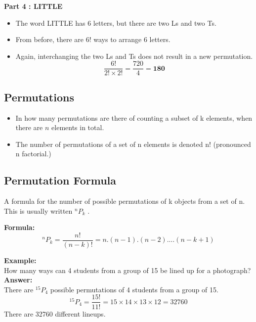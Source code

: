 \documentclass[12pt]{report}
\begin{document}
		\textbf{Part 4 : LITTLE}\\
		\begin{itemize}
			\item The word LITTLE has 6 letters, but there are two Ls and two Ts.
			\item From before, there are 6! ways to arrange 6 letters.
			\item Again, interchanging the two Ls and Ts does not result in a new permutation. 
			\LARGE
			\[\frac{6!}{2!\times 2!} =  \frac{720}{4} = \boldsymbol{180} \]
		\end{itemize}
		
		
		\subsection{Permutations}
		\large
		\begin{itemize}
			\item In how many permutations are there of counting a subset of k elements, when there are $n$ elements in total.
			
			\item The number of permutations of a set of n elements is denoted n! (pronounced n factorial.)
		\end{itemize}
		
		
		\subsection{Permutation Formula}
		
		A formula for the number of possible permutations of k objects from a set of n. This is usually written $^nP_k$ .
		
		\bigskip
		\textbf{Formula:}	
		\[ ^nP_k = \frac{n!}{(n-k)!} =  n.(n-1).(n-2).\ldots(n-k+1) \]
		
		
		
		\textbf{Example:}\\	
		How many ways can 4 students from a group of 15 be lined up for a photograph?\\
		\bigskip
		\textbf{Answer:	}\\
		There are $^{15}P_4$ possible permutations of 4 students from a group of 15.
		\[ ^{15}P_4 = \frac{15!}{11!} = 15\times 14\times 13\times 12 = 32760 \]
		There are 32760 different lineups.
		
\end{document}
